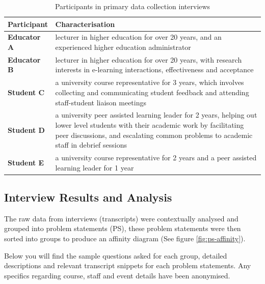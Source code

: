\begin{table}[!h] 
    \caption{Participants in primary data collection interviews}
    \centering
    \label{table:participants-req}
    \begin{tabularx}{\textwidth}{>{\bfseries}lX}
        Participant & Characterisation\\
        \toprule
        Educator A & lecturer in higher education for over 20 years, and an experienced higher education 
        administrator\\\midrule
        Educator B & lecturer in higher education for over 20 years, with research interests 
        in e-learning interactions, effectiveness and acceptance\\\midrule
        Student C & a university course representative for 3 years, which involves collecting and 
        communicating student feedback and attending staff-student liaison meetings \\\midrule
        Student D & a university peer assisted learning leader for 2 years, helping out lower level 
        students with their academic work by facilitating peer discussions, and escalating common problems
        to academic staff in debrief sessions\\\midrule
        Student E & a university course representative for 2 years and a peer assisted learning leader 
        for 1 year\\\bottomrule
    \end{tabularx}
\end{table}

\subsection{Interview Results and Analysis}

The raw data from interviews (transcripts) were contextually analysed and grouped into problem statements (PS), 
these problem statements were then sorted into groups to produce an affinity diagram (See figure 
\ref{fig:ps-affinity}).

Below you will find the sample questions asked for each group, detailed descriptions and relevant transcript 
snippets for each problem statements. 
Any specifics regarding course, staff and event details have been anonymised.

